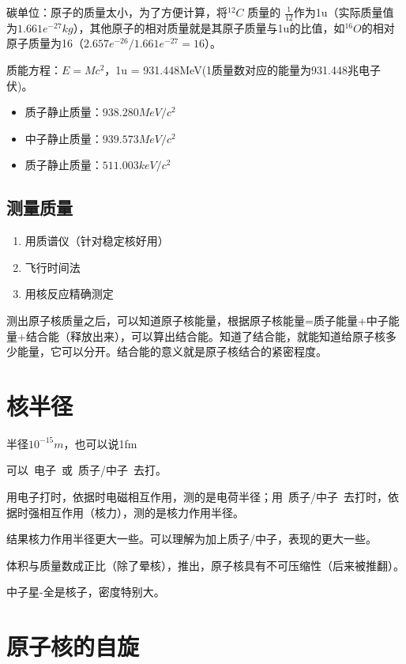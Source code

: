 碳单位：原子的质量太小，为了方便计算，将$^{12}C$ 质量的 $\frac{1}{12}$作为1u（实际质量值为$1.661e^{-27}kg$），其他原子的相对质量就是其原子质量与1u的比值，如$^{16}O$的相对原子质量为16（$2.657e^{-26}/1.661e^{-27}=16$）。
 
质能方程：$E = Mc^2$，1u = 931.448MeV(1质量数对应的能量为931.448兆电子伏)。

\begin{itemize}
    \item 质子静止质量：$938.280MeV/c^2$
    \item 中子静止质量：$939.573MeV/c^2$
    \item 质子静止质量：$511.003keV/c^2$
\end{itemize}

\subsection{测量质量}

\begin{enumerate}
    \item 用质谱仪（针对稳定核好用）
    \item 飞行时间法
    \item 用核反应精确测定
\end{enumerate}

\vspace{1.2em}

测出原子核质量之后，可以知道原子核能量，根据原子核能量=质子能量+中子能量+结合能（释放出来），可以算出结合能。知道了结合能，就能知道给原子核多少能量，它可以分开。结合能的意义就是原子核结合的紧密程度。

\section{核半径}

半径$10^{-15}m$，也可以说1fm

可以~电子~或~质子/中子~去打。

用电子打时，依据时电磁相互作用，测的是电荷半径；用~质子/中子~去打时，依据时强相互作用（核力），测的是核力作用半径。
 
结果核力作用半径更大一些。可以理解为加上质子/中子，表现的更大一些。

体积与质量数成正比（除了晕核），推出，原子核具有不可压缩性（后来被推翻）。

中子星-全是核子，密度特别大。

\section{原子核的自旋}

